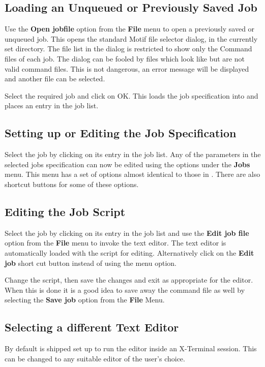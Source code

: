 \subsection{Loading an Unqueued or Previously Saved Job}
Use the \textbf{Open jobfile} option from the \textbf{File} menu to open a previously saved or unqueued job. This opens the standard Motif file
selector dialog, in the currently set directory. The file list in the dialog is restricted to show only the Command files of each job. The
dialog can be fooled by files which look like but are not valid command files. This is not dangerous, an error message will be displayed and
another file can be selected.

Select the required job and click on OK. This loads the job specification into \XmbtrName{} and places an entry in the job list.

\subsection{Setting up or Editing the Job Specification}
Select the job by clicking on its entry in the job list. Any of the parameters in the selected jobs specification can now be edited using
the options under the \textbf{Jobs} menu. This menu has a set of options almost identical to those in \PrXmbtq{}.
There are also shortcut buttons for some of these options.

\subsection{Editing the Job Script}
Select the job by clicking on its entry in the job list and use the \textbf{Edit job file} option from the \textbf{File} menu to invoke the
text editor. The text editor is automatically loaded with the script for editing. Alternatively click on the \textbf{Edit job} short cut
button instead of using the menu option.

Change the script, then save the changes and exit as appropriate for the editor. When this is done it is a good idea to save away the command
file as well by selecting the \textbf{Save job} option from the \textbf{File} Menu.

\subsection{Selecting a different Text Editor}
By default \PrXmbtr{} is shipped set up to run the  editor inside an X-Terminal session. This can
be changed to any suitable editor of the user's choice.

